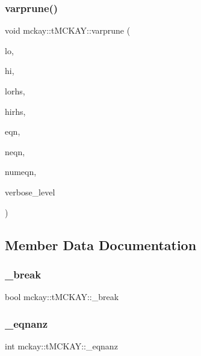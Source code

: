 \subsubsection{\texorpdfstring{varprune()}{varprune()}}
{\footnotesize\ttfamily void mckay\+::t\+M\+C\+K\+A\+Y\+::varprune (\begin{DoxyParamCaption}\item[{vector$<$ int $>$ \&}]{lo,  }\item[{vector$<$ int $>$ \&}]{hi,  }\item[{vector$<$ int $>$ \&}]{lorhs,  }\item[{vector$<$ int $>$ \&}]{hirhs,  }\item[{vector$<$ \mbox{\hyperlink{namespacemckay_a4f7cb66ed07fe573b2b08e73ab462c1a}{equation}} $>$ \&}]{eqn,  }\item[{vector$<$ int $>$ \&}]{neqn,  }\item[{int}]{numeqn,  }\item[{\mbox{\hyperlink{galois_8h_a09fddde158a3a20bd2dcadb609de11dc}{I\+NT}}}]{verbose\+\_\+level }\end{DoxyParamCaption})\hspace{0.3cm}{\ttfamily [protected]}}



\subsection{Member Data Documentation}
\mbox{\label{classmckay_1_1t_m_c_k_a_y_a64271150d4cbf651ec12f59224087752}} 
\subsubsection{\texorpdfstring{\+\_\+break}{\_break}}
{\footnotesize\ttfamily bool mckay\+::t\+M\+C\+K\+A\+Y\+::\+\_\+break\hspace{0.3cm}{\ttfamily [protected]}}

\mbox{\label{classmckay_1_1t_m_c_k_a_y_ab7812cb1bb7afcaff01433556c6574d5}} 
\subsubsection{\texorpdfstring{\+\_\+eqnanz}{\_eqnanz}}
{\footnotesize\ttfamily int mckay\+::t\+M\+C\+K\+A\+Y\+::\+\_\+eqnanz\hspace{0.3cm}{\ttfamily [protected]}}

